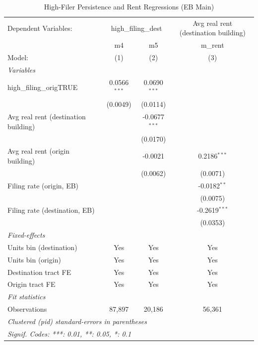 \begin{table}[htbp]
   \caption{\label{tab:evict_persist_hf_rent} High-Filer Persistence and Rent Regressions (EB Main)}
   \centering
   \begin{tabular}{lccc}
      \tabularnewline \midrule \midrule
      Dependent Variables: & \multicolumn{2}{c}{high\_filing\_dest} & Avg real rent (destination building)\\
                                           & m4             & m5              & m\_rent \\    
      Model:                               & (1)            & (2)             & (3)\\  
      \midrule
      \emph{Variables}\\
      high\_filing\_origTRUE               & 0.0566$^{***}$ & 0.0690$^{***}$  &   \\   
                                           & (0.0049)       & (0.0114)        &   \\   
      Avg real rent (destination building) &                & -0.0677$^{***}$ &   \\   
                                           &                & (0.0170)        &   \\   
      Avg real rent (origin building)      &                & -0.0021         & 0.2186$^{***}$\\   
                                           &                & (0.0062)        & (0.0071)\\   
      Filing rate (origin, EB)             &                &                 & -0.0182$^{**}$\\   
                                           &                &                 & (0.0075)\\   
      Filing rate (destination, EB)        &                &                 & -0.2619$^{***}$\\   
                                           &                &                 & (0.0353)\\   
      \midrule
      \emph{Fixed-effects}\\
      Units bin (destination)              & Yes            & Yes             & Yes\\  
      Units bin (origin)                   & Yes            & Yes             & Yes\\  
      Destination tract FE                 & Yes            & Yes             & Yes\\  
      Origin tract FE                      & Yes            & Yes             & Yes\\  
      \midrule
      \emph{Fit statistics}\\
      Observations                         & 87,897         & 20,186          & 56,361\\  
      \midrule \midrule
      \multicolumn{4}{l}{\emph{Clustered (pid) standard-errors in parentheses}}\\
      \multicolumn{4}{l}{\emph{Signif. Codes: ***: 0.01, **: 0.05, *: 0.1}}\\
   \end{tabular}
\end{table}
